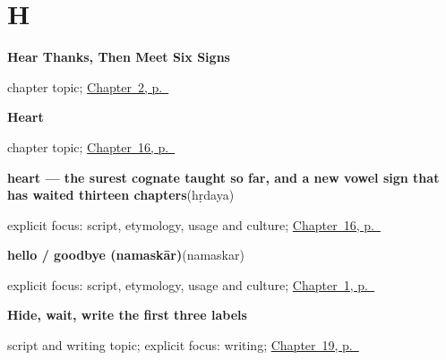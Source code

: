 \section*{H}

\noindent\begin{minipage}[t]{\linewidth}
\raggedright
\textbf{Hear Thanks, Then Meet Six Signs}\par
\footnotesize chapter topic; \hyperref[ch:thanks-script-a]{Chapter~2, p.~\pageref*{ch:thanks-script-a}}
\end{minipage}\par\smallskip

\noindent\begin{minipage}[t]{\linewidth}
\raggedright
\textbf{Heart}\par
\footnotesize chapter topic; \hyperref[ch:mr-heart]{Chapter~16, p.~\pageref*{ch:mr-heart}}
\end{minipage}\par\smallskip

\noindent\begin{minipage}[t]{\linewidth}
\raggedright
\textbf{heart — the surest cognate taught so far, and a new vowel sign that has waited thirteen chapters}\enspace\emph{}\enspace(hṛdaya)\par
\footnotesize explicit focus: script, etymology, usage and culture; \hyperref[ch:mr-heart]{Chapter~16, p.~\pageref*{ch:mr-heart}}
\end{minipage}\par\smallskip

\noindent\begin{minipage}[t]{\linewidth}
\raggedright
\textbf{hello / goodbye (namaskār)}\enspace\emph{}\enspace(namaskar)\par
\footnotesize explicit focus: script, etymology, usage and culture; \hyperref[ch:first-greeting-script]{Chapter~1, p.~\pageref*{ch:first-greeting-script}}
\end{minipage}\par\smallskip

\noindent\begin{minipage}[t]{\linewidth}
\raggedright
\textbf{Hide, wait, write the first three labels}\par
\footnotesize script and writing topic; explicit focus: writing; \hyperref[ch:mr-a1-form-labels]{Chapter~19, p.~\pageref*{ch:mr-a1-form-labels}}
\end{minipage}\par\smallskip

